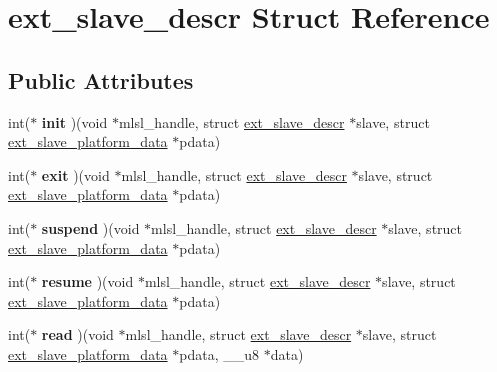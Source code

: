\hypertarget{structext__slave__descr}{}\section{ext\+\_\+slave\+\_\+descr Struct Reference}
\label{structext__slave__descr}
\subsection*{Public Attributes}
\begin{DoxyCompactItemize}
\item 
\hypertarget{structext__slave__descr_a10a111316873fc01d9a5083d783c0d12}{}int($\ast$ {\bfseries init} )(void $\ast$mlsl\+\_\+handle, struct \hyperlink{structext__slave__descr}{ext\+\_\+slave\+\_\+descr} $\ast$slave, struct \hyperlink{structext__slave__platform__data}{ext\+\_\+slave\+\_\+platform\+\_\+data} $\ast$pdata)\label{structext__slave__descr_a10a111316873fc01d9a5083d783c0d12}

\item 
\hypertarget{structext__slave__descr_a81da692b32d53d4719c75ae7eab096dc}{}int($\ast$ {\bfseries exit} )(void $\ast$mlsl\+\_\+handle, struct \hyperlink{structext__slave__descr}{ext\+\_\+slave\+\_\+descr} $\ast$slave, struct \hyperlink{structext__slave__platform__data}{ext\+\_\+slave\+\_\+platform\+\_\+data} $\ast$pdata)\label{structext__slave__descr_a81da692b32d53d4719c75ae7eab096dc}

\item 
\hypertarget{structext__slave__descr_a90273d39a1d6c0e835da4533ff0b8211}{}int($\ast$ {\bfseries suspend} )(void $\ast$mlsl\+\_\+handle, struct \hyperlink{structext__slave__descr}{ext\+\_\+slave\+\_\+descr} $\ast$slave, struct \hyperlink{structext__slave__platform__data}{ext\+\_\+slave\+\_\+platform\+\_\+data} $\ast$pdata)\label{structext__slave__descr_a90273d39a1d6c0e835da4533ff0b8211}

\item 
\hypertarget{structext__slave__descr_a953251014e138934fb869d67951190cf}{}int($\ast$ {\bfseries resume} )(void $\ast$mlsl\+\_\+handle, struct \hyperlink{structext__slave__descr}{ext\+\_\+slave\+\_\+descr} $\ast$slave, struct \hyperlink{structext__slave__platform__data}{ext\+\_\+slave\+\_\+platform\+\_\+data} $\ast$pdata)\label{structext__slave__descr_a953251014e138934fb869d67951190cf}

\item 
\hypertarget{structext__slave__descr_a2218110f0a79b96219c361cc74fc7ad5}{}int($\ast$ {\bfseries read} )(void $\ast$mlsl\+\_\+handle, struct \hyperlink{structext__slave__descr}{ext\+\_\+slave\+\_\+descr} $\ast$slave, struct \hyperlink{structext__slave__platform__data}{ext\+\_\+slave\+\_\+platform\+\_\+data} $\ast$pdata, \+\_\+\+\_\+u8 $\ast$data)\label{structext__slave__descr_a2218110f0a79b96219c361cc74fc7ad5}


\end{DoxyCompactItemize}
